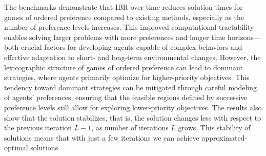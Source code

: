 The benchmarks demonstrate
that IBR over time reduces solution times
for games of ordered preference compared to existing methods, especially
as the number of preference levels increases.
This improved computational tractability enables solving larger problems
with more preferences and longer time horizons---both crucial factors
for developing agents capable
of complex behaviors and effective adaptation
to short- and long-term environmental changes.
However, the lexicographic structure of games of ordered preference can lead
to dominant strategies, where agents primarily optimize
for higher-priority objectives.
This tendency toward dominant strategies can be mitigated through careful modeling
of agents' preferences, ensuring
that the feasible regions defined
by successive preference levels still allow
for exploring lower-priority objectives.
The results also show that the solution stabilizes, that is, the solution changes less with respect to the previous iteration \(L-1\), as
number of iterations \(L\) grows. This stability of solutions means that with just a few iterations we can achieve
approximated-optimal solutions.
